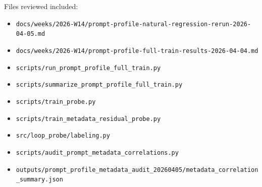 \documentclass[11pt]{article}
\begin{document}
Files reviewed included:
\begin{itemize}[leftmargin=1.5em]
\item \texttt{docs/weeks/2026-W14/prompt-profile-natural-regression-rerun-2026-04-05.md}
\item \texttt{docs/weeks/2026-W14/prompt-profile-full-train-results-2026-04-04.md}
\item \texttt{scripts/run\_prompt\_profile\_full\_train.py}
\item \texttt{scripts/summarize\_prompt\_profile\_full\_train.py}
\item \texttt{scripts/train\_probe.py}
\item \texttt{scripts/train\_metadata\_residual\_probe.py}
\item \texttt{src/loop\_probe/labeling.py}
\item \texttt{scripts/audit\_prompt\_metadata\_correlations.py}
\item \texttt{outputs/prompt\_profile\_metadata\_audit\_20260405/metadata\_correlation\_summary.json}
\end{itemize}
\end{document}
